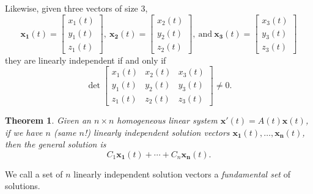 \documentclass[12pt]{amsart}
\numberwithin{equation}{section}
\theoremstyle{plain} %
\newtheorem{thm}[equation]{Theorem}
\theoremstyle{definition}
\theoremstyle{remark}
\begin{document}
Likewise, given three vectors of size $3$, \[ \mathbf{x_1}(t)=\begin{bmatrix} x_1(t) \\ y_1(t) \\ z_1(t) \end{bmatrix}, \ \mathbf{x_2}(t)=\begin{bmatrix} x_2(t) \\ y_2(t) \\ z_2(t) \end{bmatrix}, \ \text{and}  \ \mathbf{x_3}(t)=\begin{bmatrix} x_3(t) \\ y_3(t) \\ z_3(t) \end{bmatrix}\] they are linearly independent if and only if
\[ \det \begin{bmatrix} x_1(t) & x_2(t) & x_3(t) \\ y_1(t) & y_2(t) & y_3(t) \\ z_1(t) & z_2(t) & z_3(t) \end{bmatrix} \neq 0.\]

\begin{thm} Given an $n\times n$ homogeneous linear system $\mathbf{x'}(t) =A(t) \mathbf{x}(t)$, if we have $n$ (same $n$!) linearly independent solution vectors $\mathbf{x_1}(t),\dots,\mathbf{x_n}(t)$, then the general solution is
\[ C_1 \mathbf{x_1}(t) +\cdots + C_n \mathbf{x_n}(t).\]
\end{thm}

We call a set of $n$ linearly independent solution vectors a \emph{fundamental set} of solutions.
\end{document}
